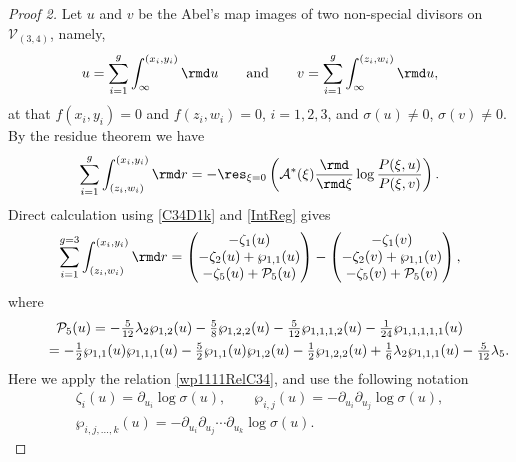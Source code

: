 \begin{proof}[Proof 2]
Let $u$ and $v$ be the Abel's map images of two non-special divisors on $\mathcal{V}_{(3,4)}$, namely,
\begin{gather}\label{uDefC34}
 u = \sum_{i=1}^g \int_{\infty}^{(x_i,y_i)} \rmd u \qquad \text{and}\qquad v = \sum_{i=1}^g \int_{\infty}^{(z_i,w_i)} \rmd u,
\end{gather}
at that $f(x_i,y_i)=0$ and $f(z_i,w_i)=0$, $i=1,2,3$, and $\sigma(u) \neq 0$, $\sigma(v) \neq 0$. By the residue theorem we have
\begin{gather}\label{ZetaDef}
 \sum_{i=1}^{g} \int^{(x_i,y_i)}_{(z_i,w_i)} \rmd r = -\res_{\xi=0}\left( \mathcal{A}^{\ast}(\xi) \frac{\rmd}{\rmd \xi}\log \frac{P(\xi,u)}{P(\xi,v)}\right).
\end{gather}
Direct calculation using \eqref{C34D1k} and \eqref{IntReg} gives
\begin{gather}\label{zetaC34}
 \sum_{i=1}^{g=3} \int_{(z_i,w_i)}^{(x_i,y_i)} \rmd r = \begin{pmatrix}
 -\zeta_1(u) \\
 -\zeta_2(u) + \wp_{1,1}(u)\\
 -\zeta_5(u) + \mathcal{P}_5(u) \end{pmatrix}
 - \begin{pmatrix}
 -\zeta_1(v) \\
 -\zeta_2(v) + \wp_{1,1}(v)\\
 -\zeta_5(v) + \mathcal{P}_5(v) \end{pmatrix},
\end{gather}
where
\begin{gather*}
\mathcal{P}_5(u) = -\tfrac{5}{12} \lambda_2 \wp _{1,2}(u) -\tfrac{5}{8} \wp_{1,2,2}(u)
-\tfrac{5}{12} \wp_{1,1,1,2}(u) -\tfrac{1}{24} \wp_{1,1,1,1,1}(u)
\\
\hphantom{\mathcal{P}_5(u)}{} = -\tfrac{1}{2} \wp_{1,1}(u)\wp_{1,1,1}(u) - \tfrac{5}{2} \wp_{1,1}(u)\wp_{1,2}(u)
-\tfrac{1}{2} \wp_{1,2,2}(u) + \tfrac{1}{6} \lambda_2 \wp_{1,1,1}(u) - \tfrac{5}{12}\lambda_5.
\end{gather*}
Here we apply the relation \eqref{wp1111RelC34}, and use the following notation
\begin{gather}
\zeta_{i}(u) = \partial_{u_i} \log \sigma(u),\qquad \wp_{i,j}(u) = -\partial_{u_i} \partial_{u_j} \log \sigma(u),\nonumber \\
\wp_{i,j,\dots,k}(u) = - \partial_{u_i} \partial_{u_j} \cdots \partial_{u_k} \log \sigma(u).\label{wpNot}
\end{gather}


\end{proof}
